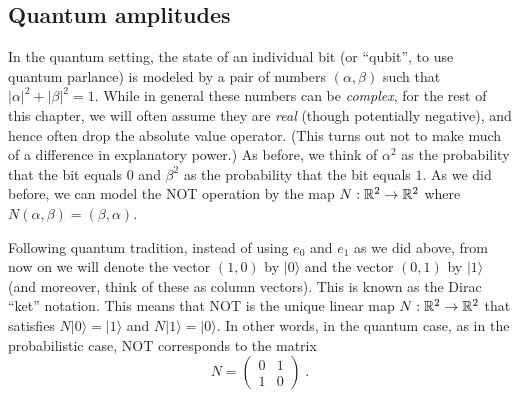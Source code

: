 \subsection{Quantum amplitudes}\label{Quantum-amplitudes}

In the quantum setting, the state of an individual bit (or ``qubit'', to
use quantum parlance) is modeled by a pair of numbers \((\alpha,\beta)\)
such that \(|\alpha|^2 + |\beta|^2 = 1\). While in general these numbers
can be \emph{complex}, for the rest of this chapter, we will often
assume they are \emph{real} (though potentially negative), and hence
often drop the absolute value operator. (This turns out not to make much
of a difference in explanatory power.) As before, we think of
\(\alpha^2\) as the probability that the bit equals \(0\) and
\(\beta^2\) as the probability that the bit equals \(1\). As we did
before, we can model the NOT operation by the map
\(N:{\mathbb{R}}^2 \rightarrow {\mathbb{R}}^2\) where \(N(\alpha,\beta)=(\beta,\alpha)\).

Following quantum tradition, instead of using \(e_0\) and \(e_1\) as we
did above, from now on we will denote the vector \((1,0)\) by
\(|0\rangle\) and the vector \((0,1)\) by \(|1\rangle\) (and moreover,
think of these as column vectors). This is known as the Dirac ``ket''
notation. This means that NOT is the unique linear map
\(N:{\mathbb{R}}^2 \rightarrow {\mathbb{R}}^2\) that satisfies \(N |0\rangle=|1\rangle\) and
\(N |1\rangle =|0\rangle\). In other words, in the quantum case, as in
the probabilistic case, NOT corresponds to the matrix \[
N = \begin{pmatrix} 0 & 1 \\ 1 & 0 \end{pmatrix} \;.
\]

